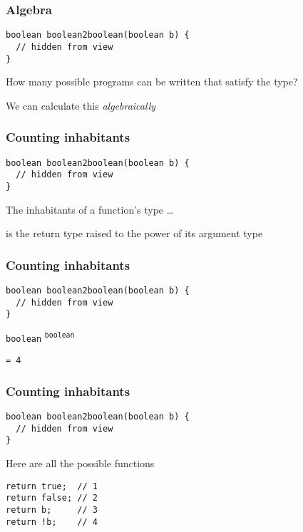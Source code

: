 \begin{frame}[fragile]
\frametitle{Algebra}
\begin{block}{}
\begin{lstlisting}[style=java]
boolean boolean2boolean(boolean b) {
  // hidden from view 
}
\end{lstlisting}
\end{block}
\begin{center}
How many possible programs can be written that satisfy the type?

We can calculate this \emph{algebraically}
\end{center}
\end{frame}

\begin{frame}[fragile]
\frametitle{Counting inhabitants}
\begin{block}{}
\begin{lstlisting}[style=java]
boolean boolean2boolean(boolean b) {
  // hidden from view 
}
\end{lstlisting}
\end{block}
\begin{center}
The inhabitants of a function's type \ldots

is the return type raised to the power of its argument type
\end{center}
\end{frame}

\begin{frame}[fragile]
\frametitle{Counting inhabitants}
\begin{block}{}
\begin{lstlisting}[style=java]
boolean boolean2boolean(boolean b) {
  // hidden from view 
}
\end{lstlisting}
\end{block}
\begin{block}{}
\lstinline{boolean} \textsuperscript{\lstinline{boolean}}

\lstinline{= 4}
\end{block}
\end{frame}

\begin{frame}[fragile]
\frametitle{Counting inhabitants}
\begin{block}{}
\begin{lstlisting}[style=java]
boolean boolean2boolean(boolean b) {
  // hidden from view 
}
\end{lstlisting}
\end{block}
\begin{block}{Here are all the possible functions}
\begin{lstlisting}[style=java]
return true;  // 1
return false; // 2
return b;     // 3
return !b;    // 4
\end{lstlisting}
\end{block}
\end{frame}

